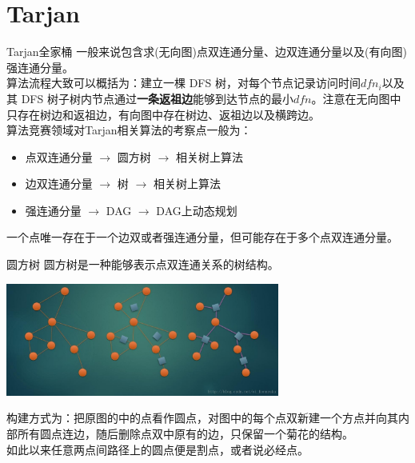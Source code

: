 \documentclass{beamer}
\begin{document}
\section{Tarjan}
\begin{frame}{Tarjan全家桶}
	一般来说包含求(无向图)点双连通分量、边双连通分量以及(有向图)强连通分量。\\
	
	算法流程大致可以概括为：建立一棵 DFS 树，对每个节点记录访问时间$dfn_i$以及其 DFS 树子树内节点通过\textbf{一条返祖边}能够到达节点的最小$dfn$。注意在无向图中只存在树边和返祖边，有向图中存在树边、返祖边以及横跨边。\\
	
	算法竞赛领域对Tarjan相关算法的考察点一般为：
	
	\begin{itemize}
		\item 点双连通分量 $\to$ 圆方树 $\to$ 相关树上算法
		\item 边双连通分量 $\to$ 树 $\to$ 相关树上算法
		\item 强连通分量 $\to$ DAG $\to$ DAG上动态规划
	\end{itemize}
	
	一个点唯一存在于一个边双或者强连通分量，但可能存在于多个点双连通分量。
	
\end{frame}

\begin{frame}{圆方树}
	圆方树是一种能够表示点双连通关系的树结构。
	
	\begin{center}
		\includegraphics[width=9.0cm]{yuanfangshu.jpg}
	\end{center}

	构建方式为：把原图的中的点看作圆点，对图中的每个点双新建一个方点并向其内部所有圆点连边，随后删除点双中原有的边，只保留一个菊花的结构。\\
	
	如此以来任意两点间路径上的圆点便是割点，或者说必经点。
\end{frame}
\end{document}
